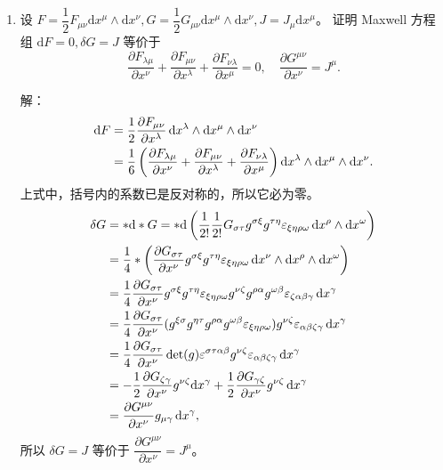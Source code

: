 \begin{enumerate}
\item 设 $F=\dfrac{1}{2} F_{\mu \nu} \mathrm{d} x^\mu \wedge \mathrm{d} x^\nu, 
G=\dfrac{1}{2} G_{\mu \nu} \mathrm{d} x^\mu \wedge \mathrm{d} x^\nu, J=J_\mu \mathrm{d} x^\mu$。
证明 Maxwell 方程组 $\mathrm{d} F=0, \delta G=J$ 等价于
$$\frac{\partial F_{\lambda \mu}}{\partial x^\nu}
+\frac{\partial F_{\mu \nu}}{\partial x^\lambda}
+\frac{\partial F_{\nu \lambda}}{\partial x^\mu}=0, 
\quad \frac{\partial G^{\mu \nu}}{\partial x^\nu}=J^\mu.$$

解：\begin{align*}
{\rm d} F & =\frac{1}{2} \frac{\partial F_{\mu \nu}}{\partial x^{\lambda}} \,{\rm d} x^{\lambda} \wedge \mathrm{d} x^{\mu} \wedge \mathrm{d} x^{\nu} \\
& =\frac{1}{6}\left(\frac{\partial F_{\lambda \mu}}{\partial x^{\nu}}+\frac{\partial F_{\mu \nu}}{\partial x^{\lambda}}+\frac{\partial F_{\nu \lambda}}{\partial x^{\mu}}\right) {\rm d} x^{\lambda} \wedge {\rm d} x^{\mu} \wedge {\rm d} x^{\nu}.
\end{align*}
上式中，括号内的系数已是反对称的，所以它必为零。
\begin{align*}
\delta G & =* {\rm d} * G=* {\rm d}\left(\frac{1}{2!} \frac{1}{2!} G_{\sigma \tau} g^{\sigma \xi} g^{\tau\eta} \varepsilon_{\xi\eta\rho\omega} \,{\rm d} x^{\rho} \wedge {\rm d} x^{\omega}\right) \\
& =\frac{1}{4} *\left(\frac{\partial G_{\sigma \tau}}{\partial x^{\nu}} g^{\sigma \xi} g^{\tau \eta} \varepsilon_{\xi\eta\rho\omega} \,{\rm d} x^{\nu} \wedge {\rm d} x^{\rho} \wedge {\rm d} x^{\omega}\right) \\
& =\frac{1}{4} \frac{\partial G_{\sigma \tau}}{\partial x^{\nu}} g^{\sigma \xi} g^{\tau \eta} \varepsilon_{\xi\eta\rho\omega} g^{\nu\zeta} g^{\rho\alpha} g^{\omega\beta} \varepsilon_{\zeta\alpha\beta\gamma} \,{\rm d} x^{\gamma} \\
& =\frac{1}{4} \frac{\partial G_{\sigma \tau}}{\partial x^{\nu}}(g^{\xi \sigma} g^{\eta \tau} g^{\rho \alpha} g^{\omega\beta} \varepsilon_{\xi\eta\rho\omega}) g^{\nu\zeta} \varepsilon_{\alpha\beta\zeta\gamma} \,{\rm d} x^{\gamma} \\
& =\frac{1}{4} \frac{\partial G_{\sigma \tau}}{\partial x^{\nu}} \det(g) \varepsilon^{\sigma \tau \alpha \beta} g^{\nu\zeta} \varepsilon_{\alpha\beta\zeta\gamma} \,{\rm d} x^{\gamma} \\
& =-\frac{1}{2} \frac{\partial G_{\zeta \gamma}}{\partial x^{\nu}} g^{\nu \zeta} \mathrm{d} x^{\gamma}+\frac{1}{2} \frac{\partial G_{\gamma\zeta}}{\partial x^{\nu}} g^{\nu \zeta} \,{\rm d} x^{\gamma} \\
& =\frac{\partial G^{\mu\nu}}{\partial x^{\nu}} g_{\mu\gamma} \,{\rm d} x^{\gamma},
\end{align*}
所以 $\delta G=J$ 等价于 $\dfrac{\partial G^{\mu \nu}}{\partial x^{\nu}}=J^{\mu}$。


\end{enumerate}
